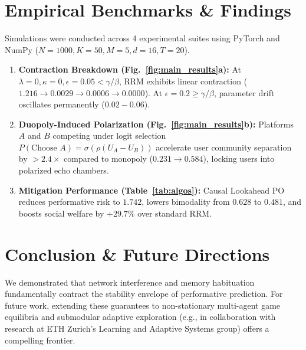 \documentclass[10pt,twocolumn]{article}
\begin{document}
\section{Empirical Benchmarks \& Findings}

Simulations were conducted across 4 experimental suites using PyTorch and NumPy ($N=1000, K=50, M=5, d=16, T=20$).

\begin{enumerate}[leftmargin=*]
    \setlength{\itemsep}{0pt}
    \item \textbf{Contraction Breakdown (Fig.~\ref{fig:main_results}a):} At $\lambda=0, \kappa=0, \epsilon=0.05 < \gamma/\beta$, RRM exhibits linear contraction ($1.216 \to 0.0029 \to 0.0006 \to 0.0000$). At $\epsilon=0.2 \ge \gamma/\beta$, parameter drift oscillates permanently ($0.02 - 0.06$).
    \item \textbf{Duopoly-Induced Polarization (Fig.~\ref{fig:main_results}b):} Platforms $A$ and $B$ competing under logit selection $P(\text{Choose } A) = \sigma(\rho (U_{A} - U_{B}))$ accelerate user community separation by $\mathbf{>2.4\times}$ compared to monopoly ($0.231 \to 0.584$), locking users into polarized echo chambers.
    \item \textbf{Mitigation Performance (Table~\ref{tab:algos}):} Causal Lookahead PO reduces performative risk to $1.742$, lowers bimodality from $0.628$ to $0.481$, and boosts social welfare by $+29.7\%$ over standard RRM.
\end{enumerate}

\section{Conclusion \& Future Directions}
We demonstrated that network interference and memory habituation fundamentally contract the stability envelope of performative prediction. For future work, extending these guarantees to non-stationary multi-agent game equilibria and submodular adaptive exploration (e.g., in collaboration with research at ETH Zurich's Learning and Adaptive Systems group) offers a compelling frontier.

\small


\end{document}
